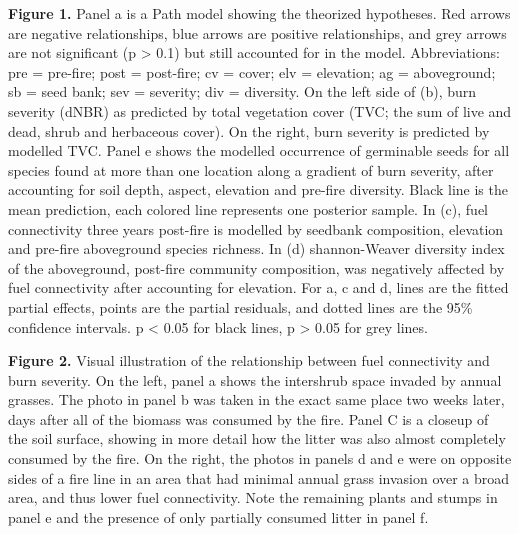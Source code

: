 \documentclass[
  12pt,
]{article}
\begin{document}
\textbf{Figure 1.} Panel a is a Path model showing the theorized
hypotheses. Red arrows are negative relationships, blue arrows are
positive relationships, and grey arrows are not significant (p
\textgreater{} 0.1) but still accounted for in the model. Abbreviations:
pre = pre-fire; post = post-fire; cv = cover; elv = elevation; ag =
aboveground; sb = seed bank; sev = severity; div = diversity. On the
left side of (b), burn severity (dNBR) as predicted by total vegetation
cover (TVC; the sum of live and dead, shrub and herbaceous cover). On
the right, burn severity is predicted by modelled TVC. Panel e shows the
modelled occurrence of germinable seeds for all species found at more
than one location along a gradient of burn severity, after accounting
for soil depth, aspect, elevation and pre-fire diversity. Black line is
the mean prediction, each colored line represents one posterior sample.
In (c), fuel connectivity three years post-fire is modelled by seedbank
composition, elevation and pre-fire aboveground species richness. In (d)
shannon-Weaver diversity index of the aboveground, post-fire community
composition, was negatively affected by fuel connectivity after
accounting for elevation. For a, c and d, lines are the fitted partial
effects, points are the partial residuals, and dotted lines are the 95\%
confidence intervals. p \textless{} 0.05 for black lines, p
\textgreater{} 0.05 for grey lines.

\textbf{Figure 2.} Visual illustration of the relationship between fuel
connectivity and burn severity. On the left, panel a shows the
intershrub space invaded by annual grasses. The photo in panel b was
taken in the exact same place two weeks later, days after all of the
biomass was consumed by the fire. Panel C is a closeup of the soil
surface, showing in more detail how the litter was also almost
completely consumed by the fire. On the right, the photos in panels d
and e were on opposite sides of a fire line in an area that had minimal
annual grass invasion over a broad area, and thus lower fuel
connectivity. Note the remaining plants and stumps in panel e and the
presence of only partially consumed litter in panel f.

\newpage
\end{document}
